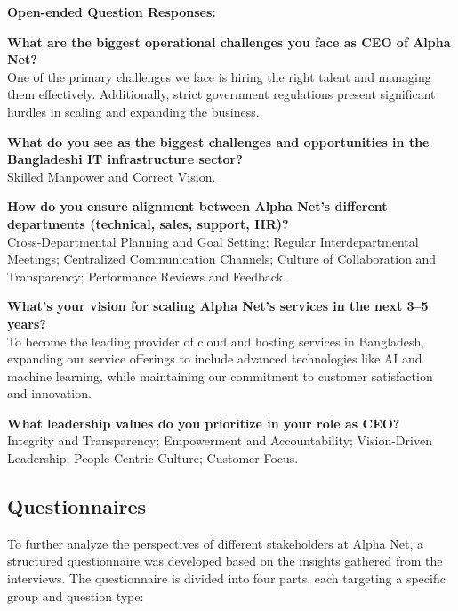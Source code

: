 \textbf{Open-ended Question Responses:}

\textbf{What are the biggest operational challenges you face as CEO of Alpha Net?}\\
One of the primary challenges we face is hiring the right talent and managing them effectively. Additionally, strict government regulations present significant hurdles in scaling and expanding the business.

\textbf{What do you see as the biggest challenges and opportunities in the Bangladeshi IT infrastructure sector?}\\
Skilled Manpower and Correct Vision.

\textbf{How do you ensure alignment between Alpha Net's different departments (technical, sales, support, HR)?}\\
Cross-Departmental Planning and Goal Setting; Regular Interdepartmental Meetings; Centralized Communication Channels; Culture of Collaboration and Transparency; Performance Reviews and Feedback.

\textbf{What's your vision for scaling Alpha Net's services in the next 3–5 years?}\\
To become the leading provider of cloud and hosting services in Bangladesh, expanding our service offerings to include advanced technologies like AI and machine learning, while maintaining our commitment to customer satisfaction and innovation.

\textbf{What leadership values do you prioritize in your role as CEO?}\\
Integrity and Transparency; Empowerment and Accountability; Vision-Driven Leadership; People-Centric Culture; Customer Focus.



\subsection{Questionnaires}
To further analyze the perspectives of different stakeholders at Alpha Net, a structured questionnaire was developed based on the insights gathered from the interviews. The questionnaire is divided into four parts, each targeting a specific group and question type:

